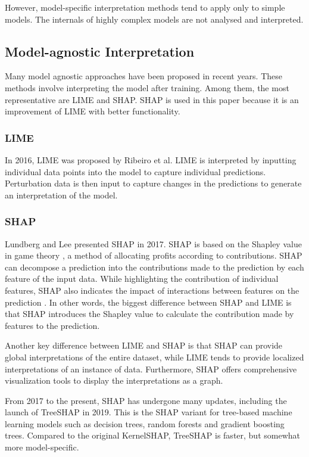 \documentclass[runningheads,a4paper]{llncs}
\begin{document}
However, model-specific interpretation methods tend to apply only to simple models. The internals of highly complex models are not analysed and interpreted.

\subsection{Model-agnostic Interpretation}
Many model agnostic approaches have been proposed in recent years. 
These methods involve interpreting the model after training.
Among them, the most representative are LIME and SHAP.
SHAP is used in this paper because it is an improvement of LIME with better functionality\cite{alvarezmelis2018robustness}.
\subsubsection{LIME}
In 2016, LIME was proposed by Ribeiro et al\cite{ribeiro2016should}.
LIME is interpreted by inputting individual data points into the model to capture individual predictions. Perturbation data is then input to capture changes in the predictions to generate an interpretation of the model.
\subsubsection{SHAP}
Lundberg and Lee presented SHAP in 2017\cite{lundberg2017unified}.
SHAP is based on the Shapley value in game theory \cite{Shapley1953}, a method of allocating profits according to contributions.
SHAP can decompose a prediction into the contributions made to the prediction by each feature of the input data.
While highlighting the contribution of individual features, SHAP also indicates the impact of interactions between features on the prediction \cite{lundberg2017unified}.
In other words, the biggest difference between SHAP and LIME is that SHAP introduces the Shapley value to calculate the contribution made by features to the prediction\cite{lundberg2017unified}.

Another key difference between LIME and SHAP is that SHAP can provide global interpretations of the entire dataset\cite{lundberg2017unified}, while LIME tends to provide localized interpretations of an instance of data\cite{ribeiro2016should}. Furthermore, SHAP offers comprehensive visualization tools to display the interpretations as a graph.

From 2017 to the present, SHAP has undergone many updates, including the launch of TreeSHAP in 2019\cite{lundberg2019consistent}.
This is the SHAP variant for tree-based machine learning models such as decision trees, random forests and gradient boosting trees. 
Compared to the original KernelSHAP, TreeSHAP is faster, but somewhat more model-specific.
\end{document}
